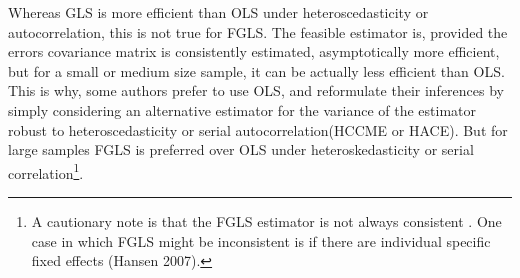 \documentclass[
  12pt,
]{article}
\begin{document}
Whereas GLS is more efficient than OLS under heteroscedasticity or autocorrelation, this is not true for FGLS. The feasible estimator is, provided the errors covariance matrix is consistently estimated, asymptotically more efficient, but for a small or medium size sample, it can be actually less efficient than OLS. This is why, some authors prefer to use OLS, and reformulate their inferences by simply considering an alternative estimator for the variance of the estimator robust to heteroscedasticity or serial autocorrelation(HCCME or HACE). But for large samples FGLS is preferred over OLS under heteroskedasticity or serial correlation\footnote{A cautionary note is that the FGLS estimator is not always \color{red} consistent \color{black}. One case in which FGLS might be inconsistent is if there are individual specific fixed effects (Hansen 2007).}.
\end{document}
